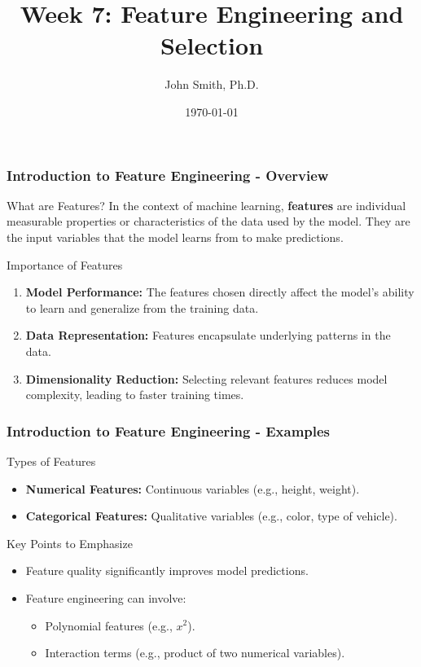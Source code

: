 \documentclass[aspectratio=169]{beamer}
\title[Feature Engineering and Selection]{Week 7: Feature Engineering and Selection}
\author[J. Smith]{John Smith, Ph.D.}
\institute[University Name]{
  Department of Computer Science\\
  University Name\\
  \vspace{0.3cm}
  Email: email@university.edu\\
  Website: www.university.edu
}
\date{\today}
\begin{document}
\frame{\titlepage}

\begin{frame}[fragile]
    \frametitle{Introduction to Feature Engineering - Overview}
    \begin{block}{What are Features?}
        In the context of machine learning, \textbf{features} are individual measurable properties or characteristics of the data used by the model. They are the input variables that the model learns from to make predictions.
    \end{block}
    
    \begin{block}{Importance of Features}
        \begin{enumerate}
            \item \textbf{Model Performance:} The features chosen directly affect the model’s ability to learn and generalize from the training data.
            \item \textbf{Data Representation:} Features encapsulate underlying patterns in the data.
            \item \textbf{Dimensionality Reduction:} Selecting relevant features reduces model complexity, leading to faster training times.
        \end{enumerate}
    \end{block}
\end{frame}

\begin{frame}[fragile]
    \frametitle{Introduction to Feature Engineering - Examples}
    \begin{block}{Types of Features}
        \begin{itemize}
            \item \textbf{Numerical Features:} Continuous variables (e.g., height, weight).
            \item \textbf{Categorical Features:} Qualitative variables (e.g., color, type of vehicle).
        \end{itemize}
    \end{block}
    
    \begin{block}{Key Points to Emphasize}
        \begin{itemize}
            \item Feature quality significantly improves model predictions.
            \item Feature engineering can involve:
            \begin{itemize}
                \item Polynomial features (e.g., \(x^2\)).
                \item Interaction terms (e.g., product of two numerical variables).
            \end{itemize}
        \end{itemize}
    \end{block}
\end{frame}
\end{document}
